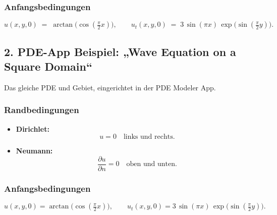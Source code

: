 \documentclass{scrartcl}
\begin{document}
\subsubsection*{Anfangsbedingungen}
\[
u(x,y,0) \;=\; \arctan\!\bigl(\cos(\tfrac{\pi}{2}x)\bigr),
\qquad
u_t(x,y,0) \;=\; 3\,\sin(\pi x)\,\exp\!\bigl(\sin(\tfrac{\pi}{2}y)\bigr).
\]

\bigskip
\subsection*{2. PDE-App Beispiel: „Wave Equation on a Square Domain“}

Das gleiche PDE und Gebiet, eingerichtet in der PDE Modeler App.

\subsubsection*{Randbedingungen}
\begin{itemize}
  \item \textbf{Dirichlet:} 
  \[
    u = 0
    \quad\text{links und rechts.}
  \]
  \item \textbf{Neumann:} 
  \[
    \frac{\partial u}{\partial n} = 0
    \quad\text{oben und unten.}
  \]
\end{itemize}

\subsubsection*{Anfangsbedingungen}
\[
u(x,y,0) = \arctan\!\bigl(\cos(\tfrac{\pi}{2}x)\bigr),
\qquad
u_t(x,y,0) = 3\,\sin(\pi x)\,\exp\!\bigl(\sin(\tfrac{\pi}{2}y)\bigr).
\]
\end{document}
